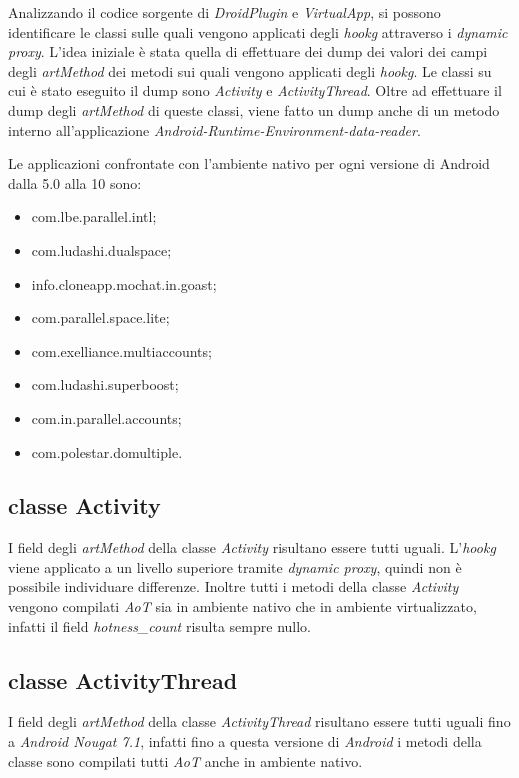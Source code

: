 Analizzando il codice sorgente di \emph{DroidPlugin} e \emph{VirtualApp}, si possono identificare le classi sulle quali vengono applicati degli \emph{\gls{hookg}} attraverso i \emph{dynamic proxy}.
L'idea iniziale è stata quella di effettuare dei dump dei valori dei campi degli \emph{artMethod} dei metodi sui quali vengono applicati degli \emph{\gls{hookg}}.
Le classi su cui è stato eseguito il dump sono \emph{Activity} e \emph{ActivityThread}. Oltre ad effettuare il dump degli \emph{artMethod} di queste classi, viene fatto un dump anche di un metodo interno all'applicazione \emph{Android-Runtime-Environment-data-reader}.

Le applicazioni confrontate con l'ambiente nativo per ogni versione di Android dalla 5.0 alla 10 sono:

\begin{itemize}
    \item com.lbe.parallel.intl;
    \item com.ludashi.dualspace;
    \item info.cloneapp.mochat.in.goast;
    \item com.parallel.space.lite;
    \item com.exelliance.multiaccounts;
    \item com.ludashi.superboost;
    \item com.in.parallel.accounts;
    \item com.polestar.domultiple.
\end{itemize}

\subsection*{classe Activity}

I field degli \emph{artMethod} della classe \emph{Activity} risultano essere tutti uguali. L'\emph{\gls{hookg}} viene applicato a un livello superiore tramite \emph{dynamic proxy}, quindi non è possibile individuare differenze.
Inoltre tutti i metodi della classe \emph{Activity} vengono compilati \emph{AoT} sia in ambiente nativo che in ambiente virtualizzato, infatti il field \emph{hotness\_count} risulta sempre nullo.

\subsection*{classe ActivityThread}

I field degli \emph{artMethod} della classe \emph{ActivityThread} risultano essere tutti uguali fino a \emph{Android Nougat 7.1}, infatti fino a questa versione di \emph{Android} i metodi della classe sono compilati tutti \emph{AoT} anche in ambiente nativo. 


